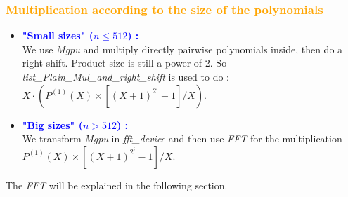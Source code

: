 \begin{frame}[fragile]
\frametitle{\textbf{\textcolor{orange}{Multiplication according to the size of the polynomials}}}

\begin{block}{}
\begin{itemize}
\item \textcolor{blue}{\textbf{"Small sizes" ($n \leq 512$) :}}\\
\hspace{4mm}
We use \textit{Mgpu} and multiply directly pairwise polynomials inside, then do a right shift. Product size is still a power of $2$. So \textit{list\_Plain\_Mul\_and\_right\_shift} is used to do : $X \cdot \left( P^{(1)}(X) \times [(X+1)^{2^i} - 1]/X \right)$.
\end{itemize}
\end{block}

\begin{block}{}
\begin{itemize}
\item \normalsize{\textcolor{blue}{\textbf{"Big sizes" ($n > 512$) :}}}\\
\hspace{4mm}
We transform \textit{Mgpu} in \textit{fft\_device} and then use \textit{FFT} for the multiplication $P^{(1)}(X) \times [(X+1)^{2^i} - 1]/X$.
\end{itemize}
\end{block}

The \textit{FFT} will be explained in the following section.

\end{frame}
